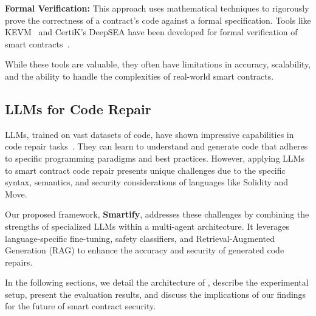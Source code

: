\textbf{Formal Verification:} This approach uses mathematical techniques to rigorously prove the correctness of a contract's code against a formal specification. Tools like KEVM~\cite{hildenbrandt2018kevm} and CertiK's DeepSEA have been developed for formal verification of smart contracts~\cite{zhong2020move}.

While these tools are valuable, they often have limitations in accuracy, scalability, and the ability to handle the complexities of real-world smart contracts.

\subsection{LLMs for Code Repair}

LLMs, trained on vast datasets of code, have shown impressive capabilities in code repair tasks~\cite{chen2021evaluating}. They can learn to understand and generate code that adheres to specific programming paradigms and best practices. However, applying LLMs to smart contract code repair presents unique challenges due to the specific syntax, semantics, and security considerations of languages like Solidity and Move.

Our proposed framework, \textbf{Smartify}, addresses these challenges by combining the strengths of specialized LLMs within a multi-agent architecture. It leverages language-specific fine-tuning, safety classifiers, and Retrieval-Augmented Generation (RAG) to enhance the accuracy and security of generated code repairs. 

In the following sections, we detail the architecture of \sln{}, describe the experimental setup, present the evaluation results, and discuss the implications of our findings for the future of smart contract security.

